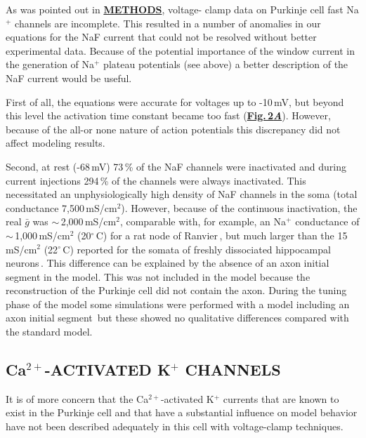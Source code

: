 \documentclass[12pt]{article}
\begin{document}
As was pointed out in \href{../pub-purkinje-deschutter1-conductance1-naf1/pub-purkinje-deschutter1-conductance1-naf1.tex}{\bf METHODS}, voltage-
clamp data on Purkinje cell fast Na$^+$ channels are incomplete.
This resulted in a number of anomalies in our
equations for the NaF current that could not be resolved
without better experimental data. Because of the potential
importance of the window current in the generation of Na$^+$
plateau potentials (see above) a better description of the
NaF current would be useful.

First of all, the equations were accurate for voltages up to
-10\,mV, but beyond this level the activation time constant
became too fast (\href{../pub-purkinje-deschutter1-conductance1-naf1/pub-purkinje-deschutter1-conductance1-naf1.tex}{\bf Fig.\,2{\it A}}). However, because of the all-or none
nature of action potentials this discrepancy did not
affect modeling results.

Second, at rest (-68\,mV) 73\,\% of the NaF channels were
inactivated and during current injections 294\,\% of the
channels were always inactivated. This necessitated an unphysiologically
high density of NaF channels in the soma
(total conductance 7,500\,mS/cm$^2$). However, because of
the continuous inactivation, the real $\bar g$ was $\sim$\,2,000\,mS/cm$^2$, 
comparable with, for example, an Na$^+$ conductance
of $\sim$\,1,000\,mS/cm$^2$ (20$^\circ$\,C) for a rat node of 
Ranvier\,\cite{Neumcke:1982qa}, but much larger than the
15\,mS/cm$^2$ (22$^\circ$\,C) reported for the somata of freshly dissociated
hippocampal neurons\,\cite{Sah:1988fv}. This difference
can be explained by the absence of an axon initial
segment in the model. This was not included in the model
because the reconstruction of the Purkinje cell did not contain
the axon. During the tuning phase of the model some
simulations were performed with a model including an
axon initial segment\,\cite{Somogyi:1976dz} but
these showed no qualitative differences compared with the
standard model.

\subsection*{Ca$^{2+}$-ACTIVATED K$^+$ CHANNELS}

It is of more concern that
the Ca$^{2+}$-activated K$^+$ currents that are known to exist in
the Purkinje cell and that have a substantial influence on
model behavior have not been described adequately in this
cell with voltage-clamp techniques.
\end{document}
